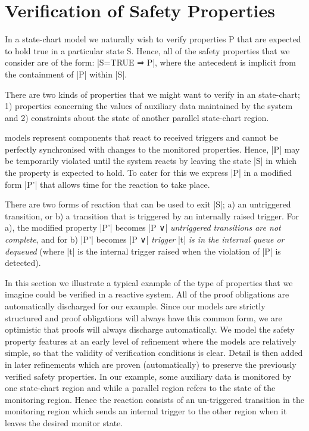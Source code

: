 

\section{Verification of Safety Properties}

In a state-chart model we naturally wish to verify properties P that are expected to hold true in a particular state S.
Hence, all of the safety properties that we consider are of the form: |S=TRUE ⇒ P|, where the antecedent is implicit from the containment of |P| within |S|.

There are two kinds of properties that we might want to verify in an \SCXML state-chart;
1) properties concerning the values of auxiliary data maintained by the system and 
2) constraints about the state of another parallel state-chart region.

\SCXML models represent components that react to received triggers and cannot be perfectly synchronised with changes to the monitored properties. 
Hence, |P| may be temporarily violated until the system reacts by leaving the state |S| in which the property is expected to hold.
To cater for this we express |P| in a modified form |P'| that allows time for the reaction to take place.

There are two forms of reaction that can be used to exit |S|; 
a) an untriggered transition, or 
b) a transition that is triggered by an internally raised trigger.
For a), the modified property |P'| becomes |P ∨| \emph{untriggered transitions are not complete}, 
and for b) |P'| becomes |P ∨| \emph{trigger} |t| \emph{is in the internal queue or dequeued}
(where |t| is the internal trigger raised when the violation of |P| is detected).


In this section we illustrate a typical example of the type of properties that we imagine could be verified in a reactive \SCXML system.
All of the proof obligations are automatically discharged for our example.
Since our models are strictly structured and proof obligations will always have this common form, we are optimistic that proofs will always discharge automatically.
We model the safety property features at an early level of refinement where the models are relatively simple, so that the validity of verification conditions is clear. 
Detail is then added in later refinements which are proven (automatically) to preserve the previously verified safety properties.
In our example, some auxiliary data is monitored by one state-chart region and while a parallel region refers to the state of the monitoring region. 
Hence the reaction consists of an un-triggered transition in the monitoring region which sends an internal trigger to the other region when it leaves the desired monitor state.

